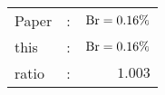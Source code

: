      \begin{tabular}{lcr}
          Paper &:& $\mathrm{Br}  = 0.16\%$ \\
          this      &:& $\mathrm{Br}  = 0.16\%$ \\
		  ratio   &:& $1.003$ \\
      \end{tabular}

